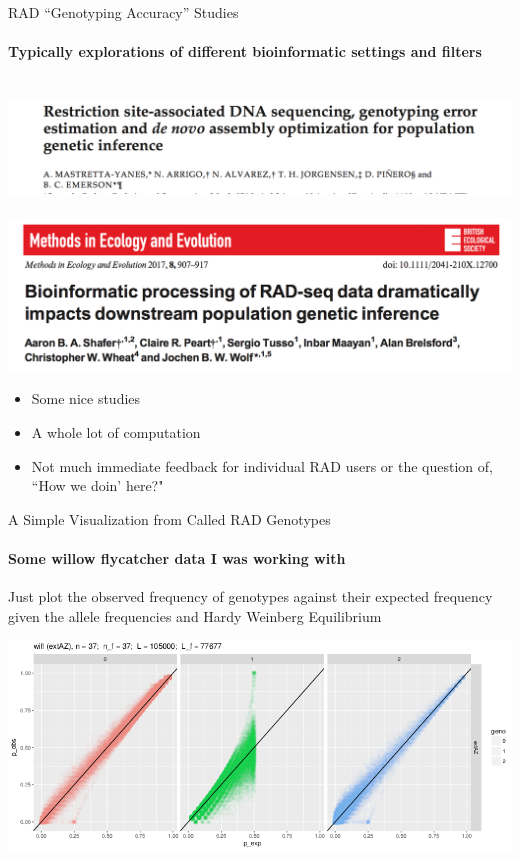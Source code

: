 \documentclass[letter,graphicx]{beamer}
\begin{document}
\begin{frame}{RAD ``Genotyping Accuracy'' Studies}
\framesubtitle{Typically explorations of different bioinformatic settings and filters}
~~~~~~~~~~~~~~~~~~~~\includegraphics[width=.75\textwidth]{./images/mast.png}\\
\vspace*{1em}
~~~~~~~~~~~~~\includegraphics[width=.75\textwidth]{./images/shafer.png}\\
\begin{itemize}
\item Some nice studies
\item A whole lot of computation
\item Not much immediate feedback for individual RAD users or the question of, ``How we doin' here?"
\end{itemize}
\end{frame}








\begin{frame}{A Simple Visualization from Called RAD Genotypes}
\framesubtitle{Some willow flycatcher data I was working with}
Just plot the observed frequency of genotypes against their expected frequency given the allele frequencies and Hardy Weinberg Equilibrium

\begin{center}
\includegraphics[width=1.0\textwidth]{./images/wifl_big_pop_no_bounds.png}
\end{center}
\end{frame}
\end{document}
